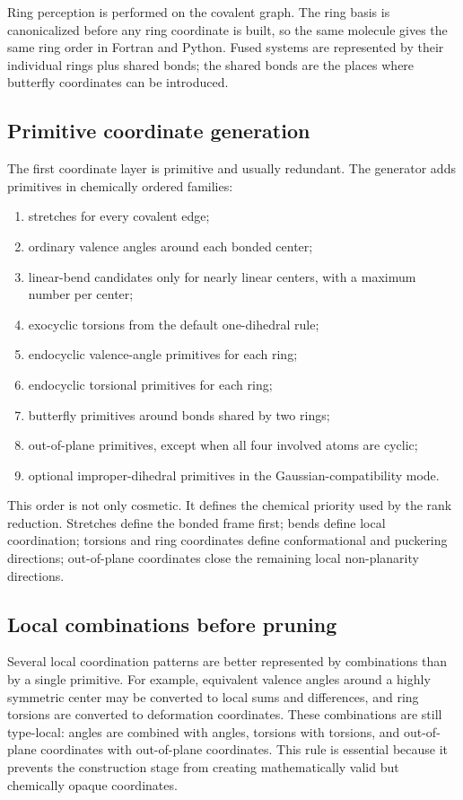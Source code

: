 \documentclass[11pt]{article}
\begin{document}
Ring perception is performed on the covalent graph.  The ring basis is
canonicalized before any ring coordinate is built, so the same molecule gives
the same ring order in Fortran and Python.  Fused systems are represented by
their individual rings plus shared bonds; the shared bonds are the places where
butterfly coordinates can be introduced.

\subsection{Primitive coordinate generation}

The first coordinate layer is primitive and usually redundant.  The generator
adds primitives in chemically ordered families:

\begin{enumerate}
  \item stretches for every covalent edge;
  \item ordinary valence angles around each bonded center;
  \item linear-bend candidates only for nearly linear centers, with a maximum
        number per center;
  \item exocyclic torsions from the default one-dihedral rule;
  \item endocyclic valence-angle primitives for each ring;
  \item endocyclic torsional primitives for each ring;
  \item butterfly primitives around bonds shared by two rings;
  \item out-of-plane primitives, except when all four involved atoms are cyclic;
  \item optional improper-dihedral primitives in the Gaussian-compatibility mode.
\end{enumerate}

This order is not only cosmetic.  It defines the chemical priority used by the
rank reduction.  Stretches define the bonded frame first; bends define local
coordination; torsions and ring coordinates define conformational and
puckering directions; out-of-plane coordinates close the remaining local
non-planarity directions.

\subsection{Local combinations before pruning}

Several local coordination patterns are better represented by combinations than
by a single primitive.  For example, equivalent valence angles around a highly
symmetric center may be converted to local sums and differences, and ring
torsions are converted to deformation coordinates.  These combinations are
still type-local: angles are combined with angles, torsions with torsions, and
out-of-plane coordinates with out-of-plane coordinates.  This rule is essential
because it prevents the construction stage from creating mathematically valid
but chemically opaque coordinates.
\end{document}

